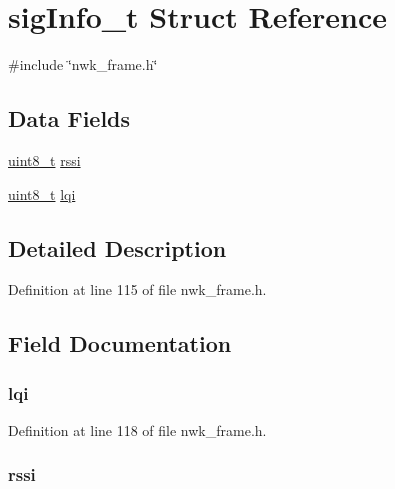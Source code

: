 \hypertarget{structsigInfo__t}{\section{sig\-Info\-\_\-t \-Struct \-Reference}
\label{structsigInfo__t}
}


{\ttfamily \#include \char`\"{}nwk\-\_\-frame.\-h\char`\"{}}

\subsection*{\-Data \-Fields}
\begin{DoxyCompactItemize}
\item 
\hyperlink{bsp__msp430__defs_8h_aba7bc1797add20fe3efdf37ced1182c5}{uint8\-\_\-t} \hyperlink{structsigInfo__t_afb67d818cd76cce8057affabcb1979a6}{rssi}
\item 
\hyperlink{bsp__msp430__defs_8h_aba7bc1797add20fe3efdf37ced1182c5}{uint8\-\_\-t} \hyperlink{structsigInfo__t_a0dd69605aea6dba42ffd851067dbfe77}{lqi}
\end{DoxyCompactItemize}


\subsection{\-Detailed \-Description}


\-Definition at line 115 of file nwk\-\_\-frame.\-h.



\subsection{\-Field \-Documentation}
\hypertarget{structsigInfo__t_a0dd69605aea6dba42ffd851067dbfe77}{
\subsubsection[{lqi}]{ {\bf lqi}}}\label{structsigInfo__t_a0dd69605aea6dba42ffd851067dbfe77}


\-Definition at line 118 of file nwk\-\_\-frame.\-h.

\hypertarget{structsigInfo__t_afb67d818cd76cce8057affabcb1979a6}{
\subsubsection[{rssi}]{ {\bf rssi}}}\label{structsigInfo__t_afb67d818cd76cce8057affabcb1979a6}


